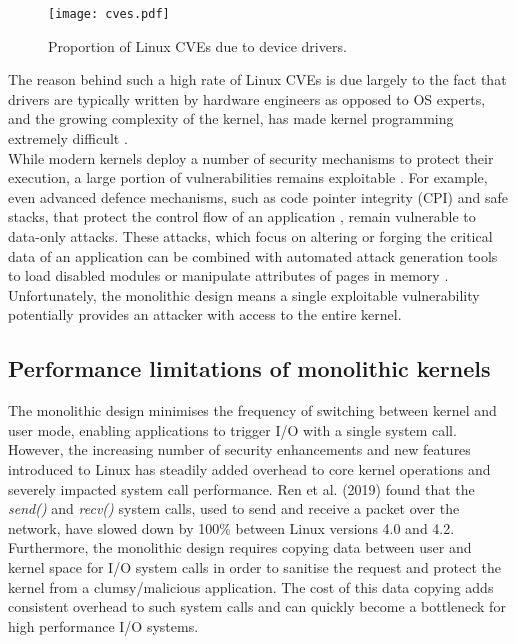 \begin{figure}[h]
  \centering
  \texttt{[image: cves.pdf]}
  \caption{Proportion of Linux CVEs due to device drivers.}
  \label{f:cves}
\end{figure}

The reason behind such a high rate of Linux CVEs is due largely to the fact that
drivers are typically written by hardware engineers as opposed to OS experts, and the growing
complexity of the kernel, has made kernel programming extremely difficult \cite{Swift_MLE_02}.\\
While modern kernels deploy a number of security mechanisms to protect their execution,
a large portion of vulnerabilities remains exploitable \cite{Narayanan_HTJB_20}. For example,
even advanced defence mechanisms, such as code pointer integrity (CPI) and safe stacks,
that protect the control flow of an application \cite{Kuznetsov_SPCSS_14}, remain
vulnerable to data-only attacks. These attacks, which focus on altering or forging
the critical data of an application can be combined with automated attack
generation tools to load disabled modules or manipulate attributes of pages in memory
\cite{Ispoglou_AJP_18}. Unfortunately, the monolithic design means a single exploitable
vulnerability potentially provides an attacker with access to the entire kernel.

\subsection{Performance limitations of monolithic kernels}
The monolithic design minimises the frequency of switching between kernel and user mode, enabling 
applications to trigger I/O with a single system call. However, the increasing number of security
enhancements and new features introduced to Linux has steadily added overhead to core
kernel operations and severely impacted system call performance. Ren et al. (2019) found
that the \emph{send()} and \emph{recv()} system calls, used to send and receive a packet over the
network, have slowed down by 100\% between Linux versions 4.0 and 4.2.
Furthermore, the monolithic design requires copying data between user and kernel space for I/O system
calls in order to sanitise the request and protect the kernel from a clumsy/malicious application. 
The cost of this data copying adds consistent overhead to such system calls and can quickly
become a bottleneck for high performance I/O systems.

